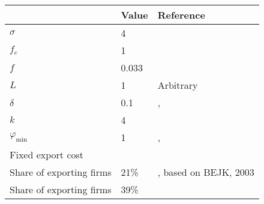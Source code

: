 \begin{tabular}{lll}
& Value & Reference\\
\hline
$\sigma$ & 4 & \cite{Irrazabal_2015}\\
$f_e$ & 1 & \cite{ghironi}\\
$f$ & 0.033 & \cite{ghironi} \\
$L$ & 1 & Arbitrary\\
$\delta$ & 0.1 & \cite{ghironi}, \cite{Irrazabal_2015}\\
$k$ & 4 \\
$\varphi_{\text{min}}$ & 1 & \cite{ghironi}, \cite{Irrazabal_2015}\\ \hline
\multicolumn{3}{l}{Fixed export cost } \\
Share of exporting firms & 21\% &  \cite{ghironi}, based on BEJK, 2003  \\
Share of exporting firms & 39\% &  \cite{Lincoln_McCallum2018} \\
\hline
\end{tabular} 